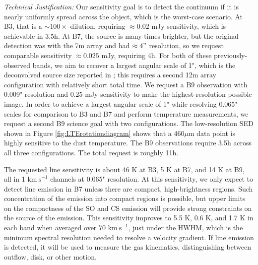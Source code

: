\documentclass[12pt,a4paper]{article}  %
\newcommand{\kms}{\ensuremath{\mathrm{km~s}^{-1}}\xspace}
\begin{document}
\textit{Technical Justification:}
Our sensitivity goal is to detect the continuum if it is nearly uniformly spread across the object, which is the worst-case scenario.
At B3, that is a $\sim100\times$ dilution, requiring $\approx 0.02$ mJy sensitivity, which is achievable in 3.5h.
At B7, the source is many times brighter, but the original detection was with the 7m array and had $\approx 4"$ resolution, so we request comparable sensitivity $\approx0.025$ mJy, requiring 4h.
For both of these previously-observed bands, we aim to recover a largest angular scale of 1", which is the deconvolved source size reported in \citep{Ginsburg2024}; this requires a second 12m array configuration with relatively short total time.
We request a B9 observation with 0.009" resolution and 0.25 mJy sensitivity to make the highest-resolution possible image.
In order to achieve a largest angular scale of 1" while resolving 0.065" scales for comparison to B3 and B7 and perform temperature measurements, we request a second B9 science goal with two configurations.
The low-resolution SED shown in Figure \ref{fig:LTErotationdiagram} shows that a 460$\mu$m data point is highly sensitive to the dust temperature.
The B9 observations require 3.5h across all three configurations.
The total request is roughly 11h.

The requested line sensitivity is about 46 K at B3, 5 K at B7, and 14 K at B9, all in 1 \kms channels at 0.065" resolution.
At this sensitivity, we only expect to detect line emission in B7 unless there are compact, high-brightness regions.
Such concentration of the emission into compact regions is possible, but upper limits on the compactness of the SO and CS emission will provide strong constraints on the source of the emission.
This sensitivity improves to 5.5 K, 0.6 K, and 1.7 K in each band when averaged over 70 \kms, just under the HWHM, which is the minimum spectral resolution needed to resolve a velocity gradient.
If line emission is detected, it will be used to measure the gas kinematics, distinguishing between outflow, disk, or other motion.
\vspace{0.2em}



\end{document}
